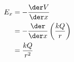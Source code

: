 \begin{align*}
	E_x	&= -\frac{\der V}{\der x} \\
		&= -\frac{\der}{\der x}\left(\frac{kQ}{r}\right) \\
		&= \frac{kQ}{r^2}
\end{align*}



